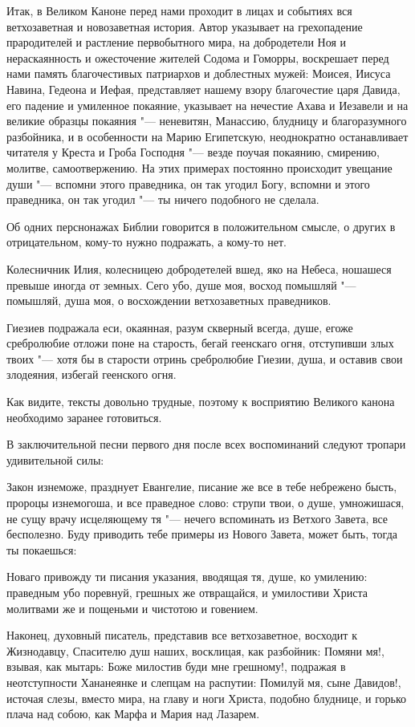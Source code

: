 \begin{mymulticols}
Итак, в Великом Каноне перед нами проходит в лицах и событиях вся ветхозаветная и новозаветная история. Автор указывает на грехопадение прародителей и растление первобытного мира, на добродетели Ноя и нераскаянность и ожесточение жителей Содома и Гоморры, воскрешает перед нами память благочестивых патриархов и доблестных мужей: Моисея, Иисуса Навина, Гедеона и Иефая, представляет нашему взору благочестие царя Давида, его падение и умиленное покаяние, указывает на нечестие Ахава и Иезавели и на великие образцы покаяния "--- неневитян, Манассию, блудницу и благоразумного разбойника, и в особенности на Марию Египетскую, неоднократно останавливает читателя у Креста и Гроба Господня "--- везде поучая покаянию, смирению, молитве, самоотвержению. На этих примерах постоянно происходит увещание души "--- вспомни этого праведника, он так угодил Богу, вспомни и этого праведника, он так угодил "--- ты ничего подобного не сделала.

Об одних перснонажах Библии говорится в положительном смысле, о других в отрицательном, кому-то нужно подражать, а кому-то нет.

Колесничник Илия, колесницею добродетелей вшед, яко на Небеса, ношашеся превыше иногда от земных. Сего убо, душе моя, восход помышляй "--- помышляй, душа моя, о восхождении ветхозаветных праведников.

Гиезиев подражала еси, окаянная, разум скверный всегда, душе, егоже сребролюбие отложи поне на старость, бегай геенскаго огня, отступивши злых твоих "--- хотя бы в старости отринь сребролюбие Гиезии, душа, и оставив свои злодеяния, избегай геенского огня.

Как видите, тексты довольно трудные, поэтому к восприятию Великого канона необходимо заранее готовиться.

В заключительной песни первого дня после всех воспоминаний следуют тропари удивительной силы:

Закон изнеможе, празднует Евангелие, писание же все в тебе небрежено бысть, пророцы изнемогоша, и все праведное слово: струпи твои, о душе, умножишася, не сущу врачу исцеляющему тя "--- нечего вспоминать из Ветхого Завета, все бесполезно. Буду приводить тебе примеры из Нового Завета, может быть, тогда ты покаешься:

Новаго привожду ти писания указания, вводящая тя, душе, ко умилению: праведным убо поревнуй, грешных же отвращайся, и умилостиви Христа молитвами же и пощеньми и чистотою и говением.

Наконец, духовный писатель, представив все ветхозаветное, восходит к Жизнодавцу, Спасителю душ наших, восклицая, как разбойник: Помяни мя!, взывая, как мытарь: Боже милостив буди мне грешному!, подражая в неотступности Хананеянке и слепцам на распутии: Помилуй мя, сыне Давидов!, источая слезы, вместо мира, на главу и ноги Христа, подобно блуднице, и горько плача над собою, как Марфа и Мария над Лазарем.


\end{mymulticols}
